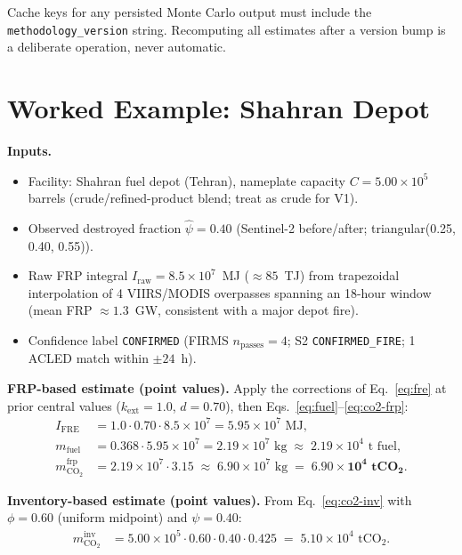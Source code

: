 \documentclass[11pt]{article}
\begin{document}
Cache keys for any persisted Monte Carlo output must include the
\texttt{methodology\_version} string. Recomputing all estimates after a
version bump is a deliberate operation, never automatic.

\section{Worked Example: Shahran Depot}
\label{sec:example}

\textbf{Inputs.}
\begin{itemize}
\item Facility: Shahran fuel depot (Tehran), nameplate capacity
  $C = 5.00 \times 10^{5}$ barrels (crude/refined-product blend; treat as
  crude for V1).
\item Observed destroyed fraction $\hat\psi = 0.40$
  (Sentinel-2 before/after; triangular(0.25, 0.40, 0.55)).
\item Raw FRP integral $I_{\mathrm{raw}} = 8.5 \times 10^{7}$~MJ
  ($\approx 85$~TJ) from trapezoidal interpolation of 4 VIIRS/MODIS
  overpasses spanning an 18-hour window
  (mean FRP $\approx 1.3$~GW, consistent with a major depot fire).
\item Confidence label \texttt{CONFIRMED} (FIRMS $n_{\text{passes}}=4$;
  S2 \texttt{CONFIRMED\_FIRE}; 1 ACLED match within $\pm 24$~h).
\end{itemize}

\textbf{FRP-based estimate (point values).} Apply the corrections of
Eq.~\eqref{eq:fre} at prior central values ($k_{\mathrm{ext}}=1.0$,
$d=0.70$), then Eqs.~\eqref{eq:fuel}--\eqref{eq:co2-frp}:
\begin{align*}
I_{\mathrm{FRE}} &= 1.0 \cdot 0.70 \cdot 8.5\times 10^{7}
   = 5.95 \times 10^{7} \text{ MJ}, \\
m_{\mathrm{fuel}} &= 0.368 \cdot 5.95\times 10^{7}
   = 2.19 \times 10^{7} \text{ kg} \;\approx\; 2.19 \times 10^{4} \text{ t fuel}, \\
m_{\mathrm{CO_2}}^{\mathrm{frp}} &= 2.19 \times 10^{7} \cdot 3.15
   \;\approx\; 6.90 \times 10^{7} \text{ kg}
   \;=\; \mathbf{6.90 \times 10^{4} \text{ tCO}_2}.
\end{align*}

\textbf{Inventory-based estimate (point values).} From Eq.~\eqref{eq:co2-inv}
with $\phi = 0.60$ (uniform midpoint) and $\psi = 0.40$:
\begin{align*}
m_{\mathrm{CO_2}}^{\mathrm{inv}} &= 5.00\times 10^{5} \cdot 0.60 \cdot 0.40
  \cdot 0.425
  \;=\; 5.10 \times 10^{4} \text{ tCO}_2.
\end{align*}
\end{document}
